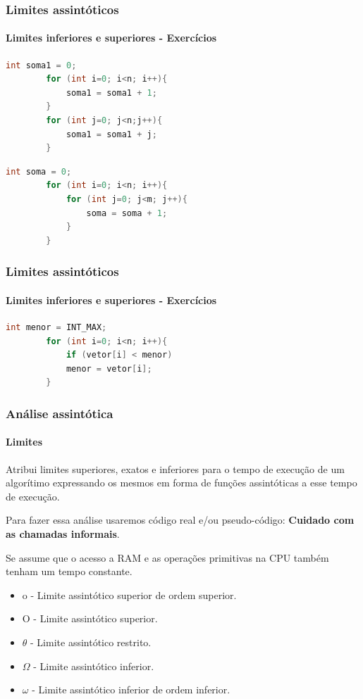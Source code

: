 \begin{frame}[fragile]
	\frametitle{Limites assintóticos}
	\framesubtitle{Limites inferiores e superiores - Exercícios}
	
	\begin{lstlisting}[language=C++,caption={Algoritmo 3}]
		int soma1 = 0;
		for (int i=0; i<n; i++){
			soma1 = soma1 + 1;
		}
		for (int j=0; j<n;j++){
			soma1 = soma1 + j;
		}
	\end{lstlisting}
	
	\begin{lstlisting}[language=C++,caption={Algoritmo 4}]
		int soma = 0;
		for (int i=0; i<n; i++){
			for (int j=0; j<m; j++){
				soma = soma + 1;
			}
		}
	\end{lstlisting}
	
\end{frame}

\begin{frame}[fragile]
	\frametitle{Limites assintóticos}
	\framesubtitle{Limites inferiores e superiores - Exercícios}
	
	\begin{lstlisting}[language=C++,caption={Algoritmo 5}]
		int menor = INT_MAX;
		for (int i=0; i<n; i++){
			if (vetor[i] < menor)
			menor = vetor[i];
		}
	\end{lstlisting}
	
\end{frame}

\begin{frame}
	\frametitle{Análise assintótica}
	\framesubtitle{Limites}
	\par Atribui limites superiores, exatos e inferiores para o tempo de execução de um algorítimo expressando os mesmos em forma de funções assintóticas a esse tempo de execução.\newline
	\par Para fazer essa análise usaremos código real e/ou pseudo-código: \textbf{Cuidado com as chamadas informais}.\newline
	
	\par Se assume que o acesso a RAM e as operações primitivas na CPU também tenham um tempo constante.
	\begin{itemize}
		\item o - Limite assintótico superior de ordem superior.
		\item O - Limite assintótico superior.
		\item $\theta$ - Limite assintótico restrito.
		\item $\Omega$ - Limite assintótico inferior.
		\item $\omega$ - Limite assintótico inferior de ordem inferior.
	\end{itemize}
\end{frame}


